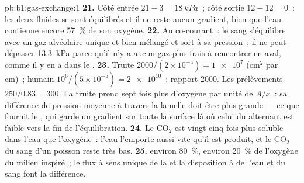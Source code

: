\begin{solution}{pb:b1:gas-exchange:1}
\textbf{21.} Côté entrée $21 - 3 = \qty{18}{kPa}$~; côté sortie $12 - 12 =
0$~: les deux fluides se sont équilibrés et il ne reste aucun gradient,
bien que l'eau contienne encore \qty{57}{\%} de son oxygène.
\textbf{22.} Au co-courant~: le sang s'équilibre avec un gaz alvéolaire
unique et bien mélangé et sort à sa pression~; il ne peut dépasser
\qty{13.3}{kPa} parce qu'il n'y a aucun gaz plus frais à rencontrer en
aval, comme il y en a dans le .
\textbf{23.} Truite $2000/(2\times 10^{-4}) = \num{1e7}$ (cm$^2$ par cm)~;
humain $10^6/(5\times 10^{-5}) = \num{2e10}$~: rapport \num{2000}. Les
prélèvements $250/0.83 = 300$. La truite prend sept fois plus d'oxygène
par unité de $A/x$~: sa différence de pression moyenne à travers la
lamelle doit être plus grande --- ce que fournit le , qui
garde un gradient sur toute la surface là où celui du  alternant
est faible vers la fin de l'équilibration.
\textbf{24.} Le $\mathrm{CO_2}$ est vingt-cinq fois plus soluble dans
l'eau que l'oxygène~: l'eau l'emporte aussi vite qu'il est produit, et
le $\mathrm{CO_2}$ du sang d'un poisson reste très bas.
\textbf{25.}  environ \qty{80}{\%},  environ \qty{20}{\%}
de l'oxygène du milieu inspiré~; le flux à sens unique de la 
et la disposition à  de l'eau et du sang font la
différence.
\end{solution}
